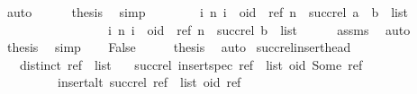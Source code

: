 \begin{isabellebody}
\ auto\isanewline
\ \ \ \ \isamarkupfalse%
\ {\isacharquery}thesis\ \isamarkupfalse%
\ simp\isanewline
\ \ \isamarkupfalse%
\isanewline
\ \ \isamarkupfalse%
\ \isamarkupfalse%
\ {\isachardoublequoteopen}{\isacharbraceleft}{\isacharparenleft}i{\isacharcomma}\ n{\isacharparenright}{\isachardot}\ i\ {\isacharequal}\ oid\ {\isasymand}\ {\isacharparenleft}ref{\isacharcomma}\ n{\isacharparenright}\ {\isasymin}\ succ{\isacharunderscore}rel\ {\isacharparenleft}a\ {\isacharhash}\ b\ {\isacharhash}\ list{\isacharparenright}{\isacharbraceright}\ {\isacharequal}\isanewline
\ \ \ \ \ \ \ \ \ \ \ \ \ \ \ \ \ {\isacharbraceleft}{\isacharparenleft}i{\isacharcomma}\ n{\isacharparenright}{\isachardot}\ i\ {\isacharequal}\ oid\ {\isasymand}\ {\isacharparenleft}ref{\isacharcomma}\ n{\isacharparenright}\ {\isasymin}\ succ{\isacharunderscore}rel\ {\isacharparenleft}b\ {\isacharhash}\ list{\isacharparenright}{\isacharbraceright}{\isachardoublequoteclose}\isanewline
\ \ \ \ \isamarkupfalse%
\ assms{\isacharparenleft}{}{\isacharparenright}\ \isamarkupfalse%
\ auto\isanewline
\ \ \isamarkupfalse%
\ \isamarkupfalse%
\ {\isacharquery}thesis\ \isamarkupfalse%
\ simp\isanewline
{}\isamarkupfalse%
\isanewline
\ \ \isamarkupfalse%
\ False\isanewline
\ \ \isamarkupfalse%
\ \isamarkupfalse%
\ {\isacharquery}thesis\ \isamarkupfalse%
\ auto\isanewline
{}\isamarkupfalse%
%
\endisatagproof
{\isafoldproof}%
%
\isadelimproof
\isanewline
%
\endisadelimproof
\isanewline
{}\isamarkupfalse%
\ succ{\isacharunderscore}rel{\isacharunderscore}insert{\isacharunderscore}head{\isacharcolon}\isanewline
\ \ \ {\isachardoublequoteopen}distinct\ {\isacharparenleft}ref\ {\isacharhash}\ list{\isacharparenright}{\isachardoublequoteclose}\isanewline
\ \ \ {\isachardoublequoteopen}succ{\isacharunderscore}rel\ {\isacharparenleft}insert{\isacharunderscore}spec\ {\isacharparenleft}ref\ {\isacharhash}\ list{\isacharparenright}\ {\isacharparenleft}oid{\isacharcomma}\ Some\ ref{\isacharparenright}{\isacharparenright}\ {\isacharequal}\isanewline
\ \ \ \ \ \ \ \ \ insert{\isacharunderscore}alt\ {\isacharparenleft}succ{\isacharunderscore}rel\ {\isacharparenleft}ref\ {\isacharhash}\ list{\isacharparenright}{\isacharparenright}\ {\isacharparenleft}oid{\isacharcomma}\ ref{\isacharparenright}{\isachardoublequoteclose}\isanewline

\end{isabellebody}
